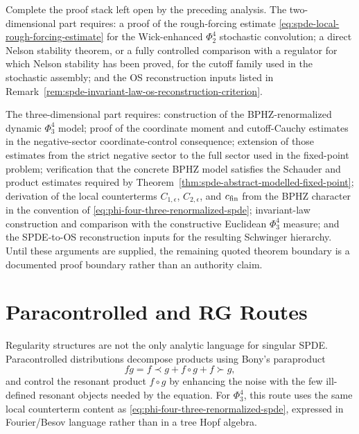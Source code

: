 \begin{openproblem}
\label{op:self-contained-singular-spde-proof-stack}
Complete the proof stack left open by the preceding analysis.  The
two-dimensional part requires: a proof of the rough-forcing estimate
\eqref{eq:spde-local-rough-forcing-estimate} for the Wick-enhanced
\(\Phi^4_2\) stochastic convolution; a direct Nelson stability theorem, or a
fully controlled comparison with a regulator for which Nelson stability has
been proved, for the cutoff family used in the stochastic assembly; and the
OS reconstruction inputs listed in
Remark~\ref{rem:spde-invariant-law-os-reconstruction-criterion}.

The three-dimensional part requires: construction of the BPHZ-renormalized
dynamic \(\Phi^4_3\) model; proof of the coordinate moment and cutoff-Cauchy
estimates in
the negative-sector coordinate-control consequence;
extension of those estimates from the strict negative sector to the full
sector used in the fixed-point problem; verification that the concrete BPHZ
model satisfies the Schauder and product estimates required by
Theorem~\ref{thm:spde-abstract-modelled-fixed-point}; derivation of the
local counterterms \(C_{1,\epsilon}\), \(C_{2,\epsilon}\), and
\(c_{\rm fin}\) from the BPHZ character in the convention of
\eqref{eq:phi-four-three-renormalized-spde}; invariant-law construction and
comparison with the constructive Euclidean \(\Phi^4_3\) measure; and the
SPDE-to-OS reconstruction inputs for the resulting Schwinger hierarchy.
Until these arguments are supplied, the remaining quoted theorem boundary is
a documented proof boundary rather than an authority claim.
\end{openproblem}

\section{Paracontrolled and RG Routes}

Regularity structures are not the only analytic language for singular SPDE.
Paracontrolled distributions decompose products using Bony's paraproduct
\[
  fg=f\prec g+f\circ g+f\succ g,
\]
and control the resonant product \(f\circ g\) by enhancing the noise with the
few ill-defined resonant objects needed by the equation.  For \(\Phi^4_3\),
this route uses the same local counterterm content as
\eqref{eq:phi-four-three-renormalized-spde}, expressed in Fourier/Besov
language rather than in a tree Hopf algebra.

